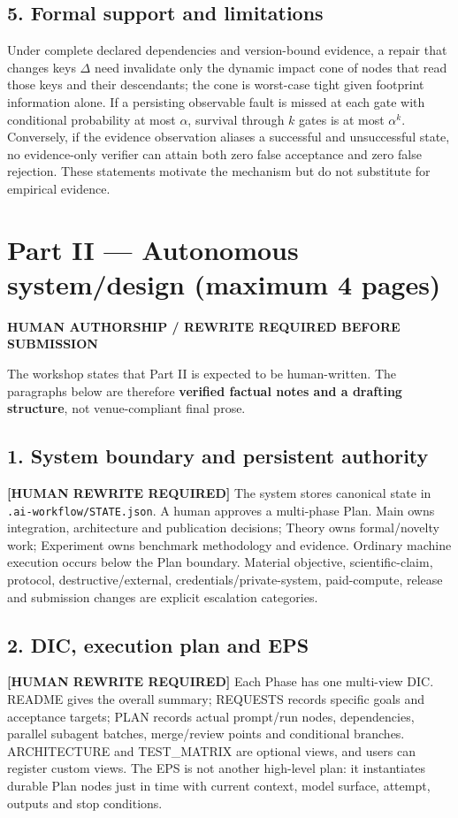 \documentclass{article}
\begin{document}
\subsection*{5. Formal support and limitations}
Under complete declared dependencies and version-bound evidence, a repair that changes keys $\Delta$ need invalidate only the dynamic impact cone of nodes that read those keys and their descendants; the cone is worst-case tight given footprint information alone. If a persisting observable fault is missed at each gate with conditional probability at most $\alpha$, survival through $k$ gates is at most $\alpha^k$. Conversely, if the evidence observation aliases a successful and unsuccessful state, no evidence-only verifier can attain both zero false acceptance and zero false rejection. These statements motivate the mechanism but do not substitute for empirical evidence.

\newpage
\section*{Part II --- Autonomous system/design (maximum 4 pages)}
\begin{center}\textbf{HUMAN AUTHORSHIP / REWRITE REQUIRED BEFORE SUBMISSION}\end{center}
The workshop states that Part II is expected to be human-written. The paragraphs below are therefore \textbf{verified factual notes and a drafting structure}, not venue-compliant final prose.

\subsection*{1. System boundary and persistent authority}
\textbf{[HUMAN REWRITE REQUIRED]} The system stores canonical state in \texttt{.ai-workflow/STATE.json}. A human approves a multi-phase Plan. Main owns integration, architecture and publication decisions; Theory owns formal/novelty work; Experiment owns benchmark methodology and evidence. Ordinary machine execution occurs below the Plan boundary. Material objective, scientific-claim, protocol, destructive/external, credentials/private-system, paid-compute, release and submission changes are explicit escalation categories.

\subsection*{2. DIC, execution plan and EPS}
\textbf{[HUMAN REWRITE REQUIRED]} Each Phase has one multi-view DIC. README gives the overall summary; REQUESTS records specific goals and acceptance targets; PLAN records actual prompt/run nodes, dependencies, parallel subagent batches, merge/review points and conditional branches. ARCHITECTURE and TEST\_MATRIX are optional views, and users can register custom views. The EPS is not another high-level plan: it instantiates durable Plan nodes just in time with current context, model surface, attempt, outputs and stop conditions.
\end{document}
